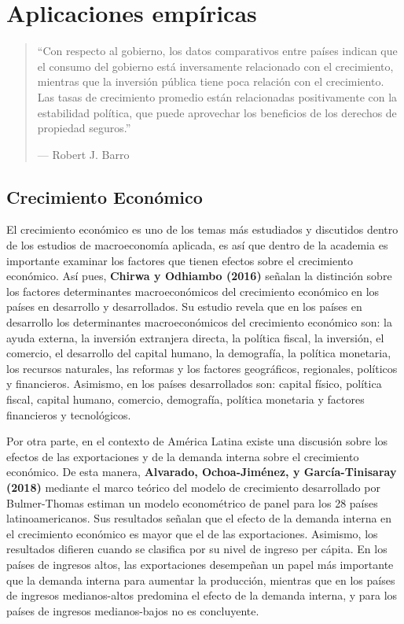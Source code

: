 \documentclass[
]{book}
\begin{document}
\hypertarget{aplicaciones-empuxedricas}{%
\chapter{Aplicaciones empíricas}\label{aplicaciones-empuxedricas}}

\begin{quote}
``Con respecto al gobierno, los datos comparativos entre países indican que el consumo del gobierno está inversamente relacionado con el crecimiento, mientras que la inversión pública tiene poca relación con el crecimiento. Las tasas de crecimiento promedio están relacionadas positivamente con la estabilidad política, que puede aprovechar los beneficios de los derechos de propiedad seguros.''

--- Robert J. Barro
\end{quote}

\hypertarget{crecimiento-econuxf3mico}{%
\section{Crecimiento Económico}\label{crecimiento-econuxf3mico}}

El crecimiento económico es uno de los temas más estudiados y discutidos dentro de los estudios de macroeconomía aplicada, es así que dentro de la academia es importante examinar los factores que tienen efectos sobre el crecimiento económico. Así pues, \textbf{Chirwa y Odhiambo (2016)} señalan la distinción sobre los factores determinantes macroeconómicos del crecimiento económico en los países en desarrollo y desarrollados. Su estudio revela que en los países en desarrollo los determinantes macroeconómicos del crecimiento económico son: la ayuda externa, la inversión extranjera directa, la política fiscal, la inversión, el comercio, el desarrollo del capital humano, la demografía, la política monetaria, los recursos naturales, las reformas y los factores geográficos, regionales, políticos y financieros. Asimismo, en los países desarrollados son: capital físico, política fiscal, capital humano, comercio, demografía, política monetaria y factores financieros y tecnológicos.

Por otra parte, en el contexto de América Latina existe una discusión sobre los efectos de las exportaciones y de la demanda interna sobre el crecimiento económico. De esta manera, \textbf{Alvarado, Ochoa-Jiménez, y García-Tinisaray (2018)} mediante el marco teórico del modelo de crecimiento desarrollado por Bulmer-Thomas estiman un modelo econométrico de panel para los 28 países latinoamericanos. Sus resultados señalan que el efecto de la demanda interna en el crecimiento económico es mayor que el de las exportaciones. Asimismo, los resultados difieren cuando se clasifica por su nivel de ingreso per cápita. En los países de ingresos altos, las exportaciones desempeñan un papel más importante que la demanda interna para aumentar la producción, mientras que en los países de ingresos medianos-altos predomina el efecto de la demanda interna, y para los países de ingresos medianos-bajos no es concluyente.
\end{document}
